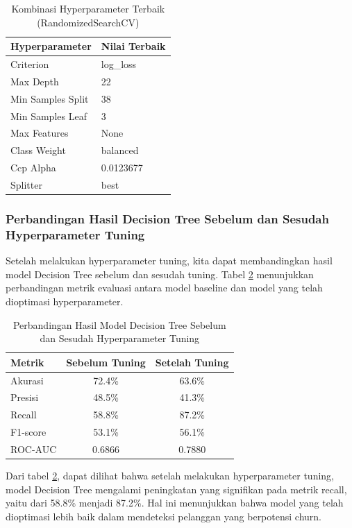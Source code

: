\begin{table}[H]
    \centering
    \caption{Kombinasi Hyperparameter Terbaik (RandomizedSearchCV)}
    \label{tab:best_params_decision_tree}
    \begin{tabular}{|l|l|}
        \hline
        \textbf{Hyperparameter} & \textbf{Nilai Terbaik} \\ \hline
        Criterion & log\_loss \\ \hline
        Max Depth & 22 \\ \hline
        Min Samples Split & 38 \\ \hline
        Min Samples Leaf & 3 \\ \hline
        Max Features & None \\ \hline
        Class Weight & balanced \\ \hline
        Ccp Alpha & 0.0123677 \\ \hline
        Splitter & best \\ \hline
    \end{tabular}
\end{table}

\subsubsection{Perbandingan Hasil Decision Tree Sebelum dan Sesudah Hyperparameter Tuning}
Setelah melakukan hyperparameter tuning, kita dapat membandingkan hasil model Decision Tree sebelum dan sesudah tuning. Tabel \ref{tab:comparison_decision_tree} menunjukkan perbandingan metrik evaluasi antara model baseline dan model yang telah dioptimasi hyperparameter.
\begin{table}[H]
    \centering
    \caption{Perbandingan Hasil Model Decision Tree Sebelum dan Sesudah Hyperparameter Tuning}
    \label{tab:comparison_decision_tree}
    \begin{tabular}{|l|c|c|}
        \hline
        \textbf{Metrik} & \textbf{Sebelum Tuning} & \textbf{Setelah Tuning} \\ \hline
        Akurasi & 72.4\% & 63.6\% \\ \hline
        Presisi & 48.5\% & 41.3\% \\ \hline
        Recall & 58.8\% & 87.2\% \\ \hline
        F1-score & 53.1\% & 56.1\% \\ \hline
        ROC-AUC & 0.6866 & 0.7880 \\ \hline
    \end{tabular}
\end{table}
Dari tabel \ref{tab:comparison_decision_tree}, dapat dilihat bahwa setelah melakukan hyperparameter tuning, model Decision Tree mengalami peningkatan yang signifikan pada metrik recall, yaitu dari 58.8\% menjadi 87.2\%. Hal ini menunjukkan bahwa model yang telah dioptimasi lebih baik dalam mendeteksi pelanggan yang berpotensi churn.

